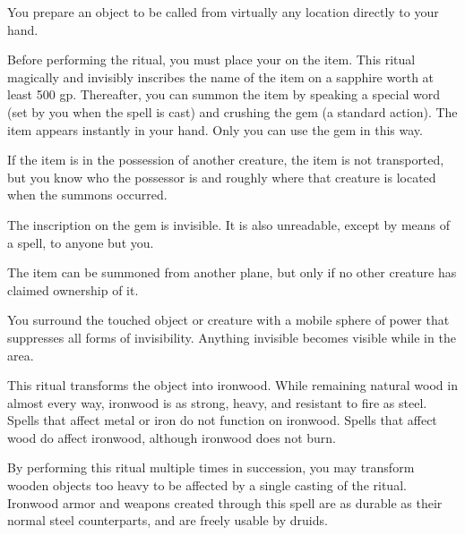 \begin{spelleffect}
You prepare an object to be called from virtually any location directly to your hand.
\par Before performing the ritual, you must place your  on the item. This ritual magically and invisibly inscribes the name of the item on a sapphire worth at least 500 gp. Thereafter, you can summon the item by speaking a special word (set by you when the spell is cast) and crushing the gem (a standard action). The item appears instantly in your hand. Only you can use the gem in this way.
\par If the item is in the possession of another creature, the item is not transported, but you know who the possessor is and roughly where that creature is located when the summons occurred.
\par The inscription on the gem is invisible. It is also unreadable, except by means of a  spell, to anyone but you.
\par The item can be summoned from another plane, but only if no other creature has claimed ownership of it.
\end{spelleffect}

\begin{spelleffect}
  You surround the touched object or creature with a mobile sphere of power that suppresses all forms of invisibility. Anything invisible becomes visible while in the area.
\end{spelleffect}

\begin{spelleffect}
This ritual transforms the object into ironwood. While remaining natural wood in almost every way, ironwood is as strong, heavy, and resistant to fire as steel. Spells that affect metal or iron do not function on ironwood. Spells that affect wood do affect ironwood, although ironwood does not burn.
\end{spelleffect}
\begin{spellnotes}
By performing this ritual multiple times in succession, you may transform wooden objects too heavy to be affected by a single casting of the ritual. Ironwood armor and weapons created through this spell are as durable as their normal steel counterparts, and are freely usable by druids.
\end{spellnotes}

